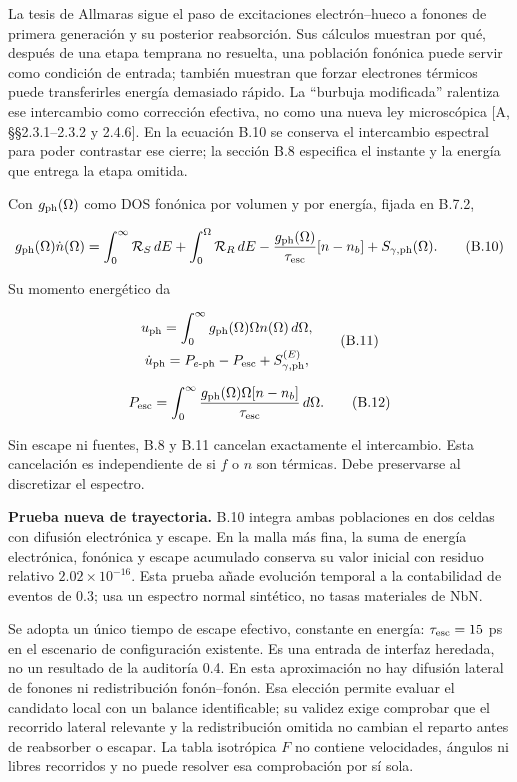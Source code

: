 \documentclass[
  spanish,
  10pt,
  a4paper,
]{article}
\newcounter{none} %
\begin{document}
La tesis de Allmaras sigue el paso de excitaciones electrón--hueco a
fonones de primera generación y su posterior reabsorción. Sus cálculos
muestran por qué, después de una etapa temprana no resuelta, una
población fonónica puede servir como condición de entrada; también
muestran que forzar electrones térmicos puede transferirles energía
demasiado rápido. La ``burbuja modificada'' ralentiza ese intercambio
como corrección efectiva, no como una nueva ley microscópica {[}A,
§§2.3.1--2.3.2 y 2.4.6{]}. En la ecuación B.10 se conserva el
intercambio espectral para poder contrastar ese cierre; la sección B.8
especifica el instante y la energía que entrega la etapa omitida.

Con \(g_{\rm ph}(\Omega)\) como DOS fonónica por volumen y por energía,
fijada en B.7.2,

\[
g_{\rm ph}(\Omega)\dot n(\Omega)=
\int_0^\infty\mathcal R_S\,dE+
\int_0^\Omega\mathcal R_R\,dE
-\frac{g_{\rm ph}(\Omega)}{\tau_{\rm esc}}[n-n_b]
+S_{\gamma,\rm ph}(\Omega). \tag{B.10}
\]

Su momento energético da

\[
\begin{gathered}
u_{\rm ph}=\int_0^\infty g_{\rm ph}(\Omega)\Omega n(\Omega)\,d\Omega,\\
\dot u_{\rm ph}=P_{e\text{-ph}}-P_{\rm esc}+S_{\gamma,\rm ph}^{(E)},
\end{gathered} \tag{B.11}
\]

\[
P_{\rm esc}=\int_0^\infty
\frac{g_{\rm ph}(\Omega)\Omega[n-n_b]}{\tau_{\rm esc}}\,d\Omega. \tag{B.12}
\]

Sin escape ni fuentes, B.8 y B.11 cancelan exactamente el intercambio.
Esta cancelación es independiente de si \(f\) o \(n\) son térmicas. Debe
preservarse al discretizar el espectro.

\textbf{Prueba nueva de trayectoria.} B.10 integra ambas poblaciones en
dos celdas con difusión electrónica y escape. En la malla más fina, la
suma de energía electrónica, fonónica y escape acumulado conserva su
valor inicial con residuo relativo \(2.02\times10^{-16}\). Esta prueba
añade evolución temporal a la contabilidad de eventos de 0.3; usa un
espectro normal sintético, no tasas materiales de NbN.

Se adopta un único tiempo de escape efectivo, constante en energía:
\(\tau_{\rm esc}=15\) ps en el escenario de configuración existente. Es
una entrada de interfaz heredada, no un resultado de la auditoría 0.4.
En esta aproximación no hay difusión lateral de fonones ni
redistribución fonón--fonón. Esa elección permite evaluar el candidato
local con un balance identificable; su validez exige comprobar que el
recorrido lateral relevante y la redistribución omitida no cambian el
reparto antes de reabsorber o escapar. La tabla isotrópica \(F\) no
contiene velocidades, ángulos ni libres recorridos y no puede resolver
esa comprobación por sí sola.
\end{document}
